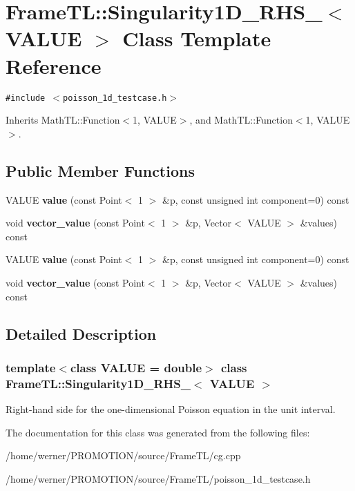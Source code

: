\hypertarget{classFrameTL_1_1Singularity1D__RHS__2}{
\section{FrameTL::Singularity1D\_\-RHS\_$<$ VALUE $>$ Class Template Reference}
\label{classFrameTL_1_1Singularity1D__RHS__2}
}
{\tt \#include $<$poisson\_\-1d\_\-testcase.h$>$}

Inherits MathTL::Function$<$1, VALUE$>$, and MathTL::Function$<$1, VALUE$>$.

\subsection*{Public Member Functions}
\begin{CompactItemize}
\item 
\hypertarget{classFrameTL_1_1Singularity1D__RHS__2_b8c94d2a33b4ffbe479954a700bf1d45}{
VALUE \textbf{value} (const Point$<$ 1 $>$ \&p, const unsigned int component=0) const }
\label{classFrameTL_1_1Singularity1D__RHS__2_b8c94d2a33b4ffbe479954a700bf1d45}

\item 
\hypertarget{classFrameTL_1_1Singularity1D__RHS__2_7b90a4cedf2e15d9c5c36895dc4aa56f}{
void \textbf{vector\_\-value} (const Point$<$ 1 $>$ \&p, Vector$<$ VALUE $>$ \&values) const }
\label{classFrameTL_1_1Singularity1D__RHS__2_7b90a4cedf2e15d9c5c36895dc4aa56f}

\item 
\hypertarget{classFrameTL_1_1Singularity1D__RHS__2_b8c94d2a33b4ffbe479954a700bf1d45}{
VALUE \textbf{value} (const Point$<$ 1 $>$ \&p, const unsigned int component=0) const }
\label{classFrameTL_1_1Singularity1D__RHS__2_b8c94d2a33b4ffbe479954a700bf1d45}

\item 
\hypertarget{classFrameTL_1_1Singularity1D__RHS__2_7b90a4cedf2e15d9c5c36895dc4aa56f}{
void \textbf{vector\_\-value} (const Point$<$ 1 $>$ \&p, Vector$<$ VALUE $>$ \&values) const }
\label{classFrameTL_1_1Singularity1D__RHS__2_7b90a4cedf2e15d9c5c36895dc4aa56f}

\end{CompactItemize}


\subsection{Detailed Description}
\subsubsection*{template$<$class VALUE = double$>$ class FrameTL::Singularity1D\_\-RHS\_$<$ VALUE $>$}

Right-hand side for the one-dimensional Poisson equation in the unit interval. 

The documentation for this class was generated from the following files:\begin{CompactItemize}
\item 
/home/werner/PROMOTION/source/FrameTL/cg.cpp\item 
/home/werner/PROMOTION/source/FrameTL/poisson\_\-1d\_\-testcase.h\end{CompactItemize}
